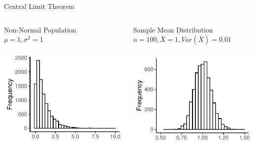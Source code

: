 \documentclass{./../div_teaching_slides}
\begin{document}
\begin{frame}{Central Limit Theorem}
\centering
\begin{columns}
\begin{column}{0.475\textwidth}
\centering
Non-Normal Population \\ $\mu=1, \sigma^2 = 1$ \\~\\
\includegraphics{./../../output/clt_exp_pop.pdf}
\end{column}
\begin{column}{0.475\textwidth}
\centering
Sample Mean Distribution \\ $n=100, \bar{X}=1, Var(\bar{X}) = 0.01$ \\~\\
\includegraphics{./../../output/clt_exp_samp_n100.pdf}
\end{column}
\end{columns}
\end{frame}
\end{document}
